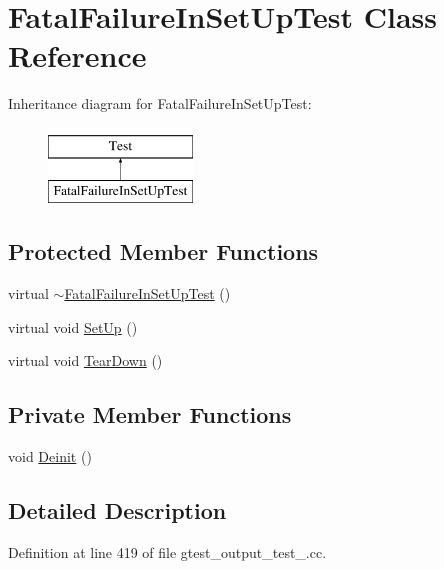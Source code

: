 \hypertarget{classFatalFailureInSetUpTest}{\section{\-Fatal\-Failure\-In\-Set\-Up\-Test \-Class \-Reference}
\label{d3/d68/classFatalFailureInSetUpTest}
}
\-Inheritance diagram for \-Fatal\-Failure\-In\-Set\-Up\-Test\-:\begin{figure}[H]
\begin{center}
\leavevmode
\includegraphics[height=2.000000cm]{d3/d68/classFatalFailureInSetUpTest}
\end{center}
\end{figure}
\subsection*{\-Protected \-Member \-Functions}
\begin{DoxyCompactItemize}
\item 
virtual \hyperlink{classFatalFailureInSetUpTest_adaaec8391124b834302be3d8df34f3f3}{$\sim$\-Fatal\-Failure\-In\-Set\-Up\-Test} ()
\item 
virtual void \hyperlink{classFatalFailureInSetUpTest_a901706a587f9ae84df8b2395fbe759cb}{\-Set\-Up} ()
\item 
virtual void \hyperlink{classFatalFailureInSetUpTest_a870a092058305911f3d42df45dd657e5}{\-Tear\-Down} ()
\end{DoxyCompactItemize}
\subsection*{\-Private \-Member \-Functions}
\begin{DoxyCompactItemize}
\item 
void \hyperlink{classFatalFailureInSetUpTest_a9f9d89fef9cb9c06f25222102d276470}{\-Deinit} ()
\end{DoxyCompactItemize}


\subsection{\-Detailed \-Description}


\-Definition at line 419 of file gtest\-\_\-output\-\_\-test\-\_\-.\-cc.




